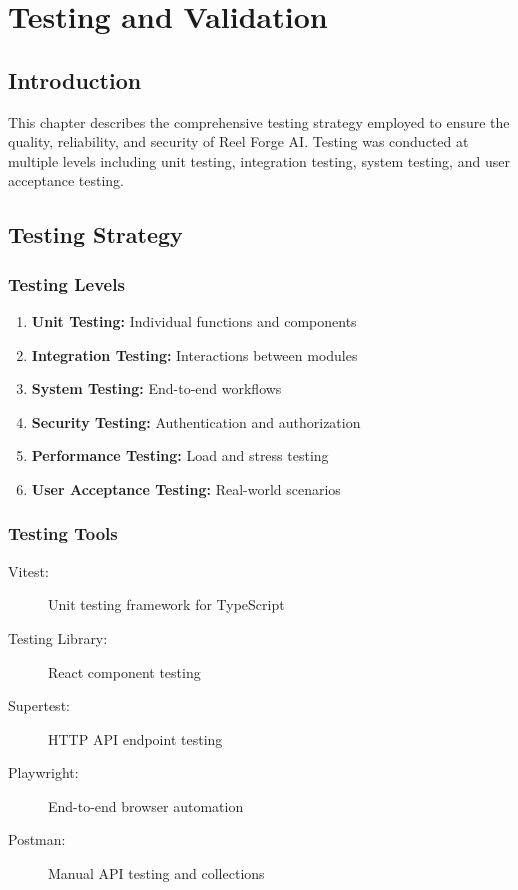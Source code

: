 \chapter{Testing and Validation}

\section{Introduction}

This chapter describes the comprehensive testing strategy employed to ensure the quality, reliability, and security of Reel Forge AI. Testing was conducted at multiple levels including unit testing, integration testing, system testing, and user acceptance testing.

\section{Testing Strategy}

\subsection{Testing Levels}

\begin{enumerate}
    \item \textbf{Unit Testing:} Individual functions and components
    \item \textbf{Integration Testing:} Interactions between modules
    \item \textbf{System Testing:} End-to-end workflows
    \item \textbf{Security Testing:} Authentication and authorization
    \item \textbf{Performance Testing:} Load and stress testing
    \item \textbf{User Acceptance Testing:} Real-world scenarios
\end{enumerate}

\subsection{Testing Tools}

\begin{description}
    \item[Vitest:] Unit testing framework for TypeScript
    \item[Testing Library:] React component testing
    \item[Supertest:] HTTP API endpoint testing
    \item[Playwright:] End-to-end browser automation
    \item[Postman:] Manual API testing and collections
\end{description}

